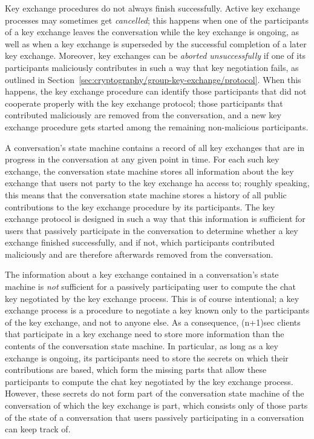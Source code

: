 \documentclass{article}
\begin{document}
Key exchange procedures do not always finish successfully.
Active key exchange processes may sometimes get \emph{cancelled}; this happens when one of the participants of a key exchange leaves the conversation while the key exchange is ongoing, as well as when a key exchange is superseded by the successful completion of a later key exchange.
Moreover, key exchanges can be \emph{aborted unsuccessfully} if one of its participants maliciously contributes in such a way that key negotiation fails, as outlined in Section~\ref{sec:cryptography/group-key-exchange/protocol}.
When this happens, the key exchange procedure can identify those participants that did not cooperate properly with the key exchange protocol; those participants that contributed maliciously are removed from the conversation, and a new key exchange procedure gets started among the remaining non-malicious participants.


A conversation's state machine contains a record of all key exchanges that are in progress in the conversation at any given point in time.
For each such key exchange, the conversation state machine stores all information about the key exchange that users not party to the key exchange ha access to; roughly speaking, this means that the conversation state machine stores a history of all public contributions to the key exchange procedure by its participants.
The key exchange protocol is designed in such a way that this information is sufficient for users that passively participate in the conversation to determine whether a key exchange finished successfully, and if not, which participants contributed maliciously and are therefore afterwards removed from the conversation.

The information about a key exchange contained in a conversation's state machine is \emph{not} sufficient for a passively participating user to compute the chat key negotiated by the key exchange process.
This is of course intentional; a key exchange process is a procedure to negotiate a key known only to the participants of the key exchange, and not to anyone else.
As a consequence, (n+1)sec clients that participate in a key exchange need to store more information than the contents of the conversation state machine.
In particular, as long as a key exchange is ongoing, its participants need to store the secrets on which their contributions are based, which form the missing parts that allow these participants to compute the chat key negotiated by the key exchange process.
However, these secrets do not form part of the conversation state machine of the conversation of which the key exchange is part, which consists only of those parts of the state of a conversation that users passively participating in a conversation can keep track of.
\end{document}
